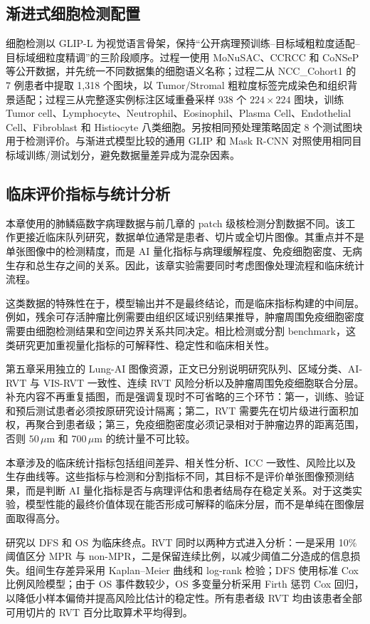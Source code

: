 \subsection{渐进式细胞检测配置}
细胞检测以 GLIP-L 为视觉语言骨架，保持“公开病理预训练--目标域粗粒度适配--目标域细粒度精调”的三阶段顺序。过程一使用 MoNuSAC、CCRCC 和 CoNSeP 等公开数据，并先统一不同数据集的细胞语义名称；过程二从 NCC\_Cohort1 的 7 例患者中提取 1,318 个图块，以 Tumor/Stromal 粗粒度标签完成染色和组织背景适配；过程三从完整逐实例标注区域重叠采样 938 个 $224\times224$ 图块，训练 Tumor cell、Lymphocyte、Neutrophil、Eosinophil、Plasma Cell、Endothelial Cell、Fibroblast 和 Histiocyte 八类细胞。另按相同预处理策略固定 8 个测试图块用于检测评价。与渐进式模型比较的通用 GLIP 和 Mask R-CNN 对照使用相同目标域训练/测试划分，避免数据量差异成为混杂因素。

\subsection{临床评价指标与统计分析}
本章使用的肺鳞癌数字病理数据与前几章的 patch 级核检测分割数据不同。该工作更接近临床队列研究，数据单位通常是患者、切片或全切片图像。其重点并不是单张图像中的检测精度，而是 AI 量化指标与病理缓解程度、免疫细胞密度、无病生存和总生存之间的关系。因此，该章实验需要同时考虑图像处理流程和临床统计流程。

这类数据的特殊性在于，模型输出并不是最终结论，而是临床指标构建的中间层。例如，残余可存活肿瘤比例需要由组织区域识别结果推导，肿瘤周围免疫细胞密度需要由细胞检测结果和空间边界关系共同决定。相比检测或分割 benchmark，这类研究更加重视量化指标的可解释性、稳定性和临床相关性。

第五章采用独立的 Lung-AI 图像资源，正文已分别说明研究队列、区域分类、AI-RVT 与 VIS-RVT 一致性、连续 RVT 风险分析以及肿瘤周围免疫细胞联合分层。补充内容不再重复插图，而是强调复现时不可省略的三个环节：第一，训练、验证和预后测试患者必须按原研究设计隔离；第二，RVT 需要先在切片级进行面积加权，再聚合到患者级；第三，免疫细胞密度必须记录相对于肿瘤边界的距离范围，否则 $50\,\mu\mathrm{m}$ 和 $700\,\mu\mathrm{m}$ 的统计量不可比较。

本章涉及的临床统计指标包括组间差异、相关性分析、ICC 一致性、风险比以及生存曲线等。这些指标与检测和分割指标不同，其目标不是评价单张图像预测结果，而是判断 AI 量化指标是否与病理评估和患者结局存在稳定关系。对于这类实验，模型性能的最终价值体现在能否形成可解释的临床分层，而不是单纯在图像层面取得高分。

研究以 DFS 和 OS 为临床终点。RVT 同时以两种方式进入分析：一是采用 10\% 阈值区分 MPR 与 non-MPR，二是保留连续比例，以减少阈值二分造成的信息损失。组间生存差异采用 Kaplan--Meier 曲线和 log-rank 检验；DFS 使用标准 Cox 比例风险模型；由于 OS 事件数较少，OS 多变量分析采用 Firth 惩罚 Cox 回归，以降低小样本偏倚并提高风险比估计的稳定性。所有患者级 RVT 均由该患者全部可用切片的 RVT 百分比取算术平均得到。


